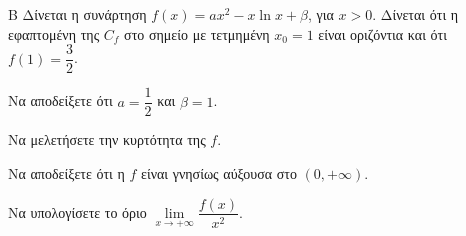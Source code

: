 \begin{thema}{Β}
Δίνεται η συνάρτηση $f(x) = a x^2 - x \ln x + \beta$, για $x>0$. Δίνεται ότι η εφαπτομένη της $C_f$ στο σημείο με τετμημένη $x_0=1$ είναι οριζόντια και ότι $f(1)=\dfrac{3}{2}$.
\begin{erwthma}
  \item Να αποδείξετε ότι $a=\dfrac{1}{2}$ και $\beta=1$.
  \item Να μελετήσετε την κυρτότητα της $f$.
  \item Να αποδείξετε ότι η $f$ είναι γνησίως αύξουσα στο $(0,+\infty)$.
  \item Να υπολογίσετε το όριο $\lim\limits_{x \to +\infty} \dfrac{f(x)}{x^2}$.
\end{erwthma}
\end{thema}
